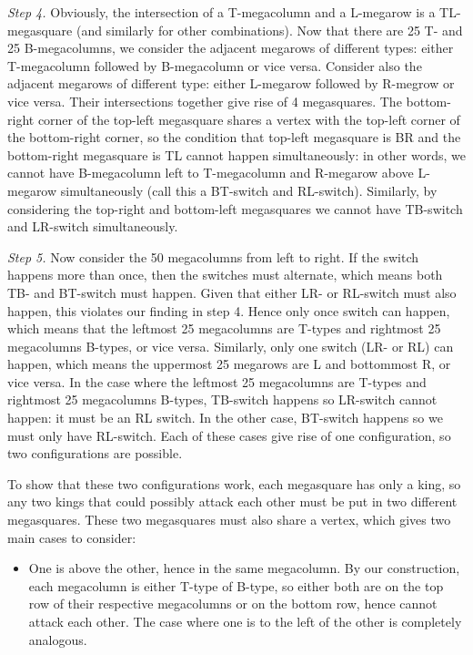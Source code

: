 \documentclass[11pt]{article}
\newcommand{\<}{\langle}
\renewcommand{\>}{\rangle}
\begin{document}
\begin{enumerate}
	\emph{Step 4.} Obviously, the intersection of a T-megacolumn and a L-megarow is a TL-megasquare (and similarly for other combinations). Now that there are 25 T- and 25 B-megacolumns, we consider the adjacent megarows of different types: either T-megacolumn followed by B-megacolumn or vice versa. Consider also the adjacent megarows of different type: either L-megarow followed by R-megrow or vice versa. Their intersections together give rise of 4 megasquares. The bottom-right corner of the top-left megasquare shares a vertex with the top-left corner of the bottom-right corner, so the condition that top-left megasquare is BR and the bottom-right megasquare is TL cannot happen simultaneously: in other words, we cannot have B-megacolumn left to T-megacolumn and R-megarow above L-megarow simultaneously (call this a BT-switch and RL-switch). 
	Similarly, by considering the top-right and bottom-left megasquares we cannot have 	TB-switch and LR-switch simultaneously. 
	
	\emph{Step 5.} Now consider the 50 megacolumns from left to right. If the switch happens more than once, then the switches must alternate, which means both TB- and BT-switch must happen. Given that either LR- or RL-switch must also happen, this violates our finding in step 4. Hence only once switch can happen, which means that the leftmost 25 megacolumns are T-types and rightmost 25 megacolumns B-types, or vice versa. Similarly, only one switch (LR- or RL) can happen, which means the uppermost 25 megarows are L and bottommost R, or vice versa. In the case where the leftmost 25 megacolumns are T-types and rightmost 25 megacolumns B-types, TB-switch happens so LR-switch cannot happen: it must be an RL switch. In the other case, BT-switch happens so we must only have RL-switch. Each of these cases give rise of one configuration, so two configurations are possible. 
	
	To show that these two configurations work, each megasquare has only a king, so any two kings that could possibly attack each other must be put in two different megasquares. These two megasquares must also share a vertex, which gives two main cases to consider:
	\begin{itemize}
		\item One is above the other, hence in the same megacolumn. By our construction, each megacolumn is either T-type of B-type, so either both are on the top row of their respective megacolumns or on the bottom row, hence cannot attack each other. The case where one is to the left of the other is completely analogous. 
		

\end{itemize}
\end{enumerate}
\end{document}
